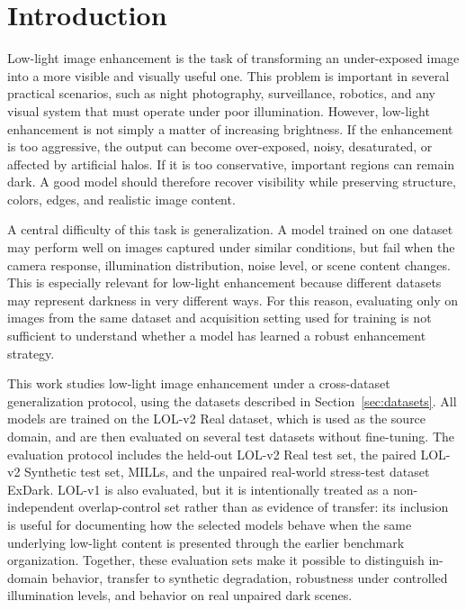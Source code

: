 \section{Introduction}

Low-light image enhancement is the task of transforming an under-exposed image into a more visible and visually useful one. This problem is important in several practical scenarios, such as night photography, surveillance, robotics, and any visual system that must operate under poor illumination. However, low-light enhancement is not simply a matter of increasing brightness. If the enhancement is too aggressive, the output can become over-exposed, noisy, desaturated, or affected by artificial halos. If it is too conservative, important regions can remain dark. A good model should therefore recover visibility while preserving structure, colors, edges, and realistic image content.

A central difficulty of this task is generalization. A model trained on one dataset may perform well on images captured under similar conditions, but fail when the camera response, illumination distribution, noise level, or scene content changes. This is especially relevant for low-light enhancement because different datasets may represent darkness in very different ways. For this reason, evaluating only on images from the same dataset and acquisition setting used for training is not sufficient to understand whether a model has learned a robust enhancement strategy.

This work studies low-light image enhancement under a cross-dataset generalization protocol, using the datasets described in Section~\ref{sec:datasets}. All models are trained on the LOL-v2 Real dataset, which is used as the source domain, and are then evaluated on several test datasets without fine-tuning. The evaluation protocol includes the held-out LOL-v2 Real test set, the paired LOL-v2 Synthetic test set, MILLs, and the unpaired real-world stress-test dataset ExDark. LOL-v1 is also evaluated, but it is intentionally treated as a non-independent overlap-control set rather than as evidence of transfer: its inclusion is useful for documenting how the selected models behave when the same underlying low-light content is presented through the earlier benchmark organization. Together, these evaluation sets make it possible to distinguish in-domain behavior, transfer to synthetic degradation, robustness under controlled illumination levels, and behavior on real unpaired dark scenes.

